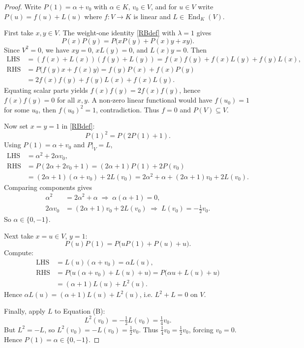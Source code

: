 \documentclass[10pt,a4paper]{amsart}
\DeclareMathOperator{\End}{End}
\begin{document}
\begin{proof}
Write $P(1) = \alpha + v_0$ with $\alpha \in K$, $v_0 \in V$, and for $u \in V$ write $P(u) = f(u) + L(u)$ where $f : V \to K$ is linear and $L \in \End_K(V)$.

First take $x, y \in V$.  The weight‑one identity \eqref{RBdef} with $\lambda=1$ gives
\[
P(x)P(y) = P\bigl(x P(y) + P(x) y + xy\bigr).
\]
Since $V^2=0$, we have $xy=0$, $x L(y)=0$, and $L(x) y=0$.  Then
\begin{align*}
\text{LHS} &= (f(x)+L(x))(f(y)+L(y)) = f(x)f(y) + f(x)L(y) + f(y)L(x),\\
\text{RHS} &= P\bigl(f(y)x + f(x)y\bigr) = f(y)P(x) + f(x)P(y)\\
 &= 2f(x)f(y) + f(y)L(x) + f(x)L(y).
\end{align*}
Equating scalar parts yields $f(x)f(y) = 2f(x)f(y)$, hence $f(x)f(y)=0$ for all $x,y$.  A non‑zero linear functional would have $f(u_0)=1$ for some $u_0$, then $f(u_0)^2=1$, contradiction.  Thus $f=0$ and $P(V) \subseteq V$.

Now set $x = y = 1$ in \eqref{RBdef}:
\[
P(1)^2 = P(2P(1) + 1).
\]
Using $P(1)=\alpha+v_0$ and $P|_V = L$,
\begin{align*}
\text{LHS} &= \alpha^2 + 2\alpha v_0,\\
\text{RHS} &= P(2\alpha + 2v_0 + 1) = (2\alpha+1)P(1) + 2P(v_0) \\
&= (2\alpha+1)(\alpha+v_0) + 2L(v_0) = 2\alpha^2+\alpha + (2\alpha+1)v_0 + 2L(v_0).
\end{align*}
Comparing components gives
\begin{align*}
\alpha^2 &= 2\alpha^2 + \alpha \;\Longrightarrow\; \alpha(\alpha+1)=0,\\
2\alpha v_0 &= (2\alpha+1)v_0 + 2L(v_0) \;\Longrightarrow\; L(v_0) = -\tfrac12 v_0. \tag{B}
\end{align*}
So $\alpha \in \{0, -1\}$.

Next take $x = u \in V$, $y = 1$:
\[
P(u)P(1) = P\bigl(u P(1) + P(u) + u\bigr).
\]
Compute:
\begin{align*}
\text{LHS} &= L(u)(\alpha+v_0) = \alpha L(u),\\
\text{RHS} &= P\bigl(u(\alpha+v_0) + L(u) + u\bigr) = P\bigl(\alpha u + L(u) + u\bigr)\\
&= (\alpha+1)L(u) + L^2(u).
\end{align*}
Hence $\alpha L(u) = (\alpha+1)L(u) + L^2(u)$, i.e. $L^2 + L = 0$ on $V$.

Finally, apply $L$ to Equation (B):
\[
L^2(v_0) = -\tfrac12 L(v_0) = \tfrac14 v_0.
\]
But $L^2 = -L$, so $L^2(v_0) = -L(v_0) = \tfrac12 v_0$.  Thus $\tfrac14 v_0 = \tfrac12 v_0$, forcing $v_0=0$.  Hence $P(1) = \alpha \in \{0,-1\}$.
\end{proof}
\end{document}
